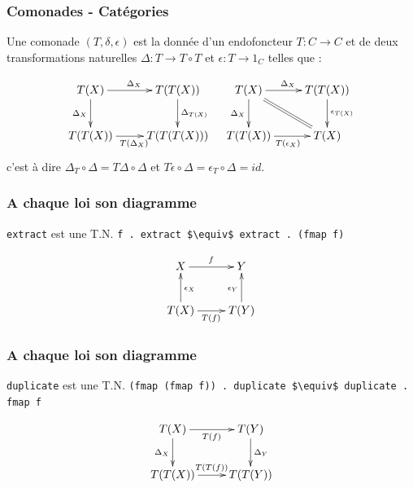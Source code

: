 \documentclass{beamer}
\begin{document}
\begin{frame}
\frametitle{Comonades - Catégories}
Une comonade $(T, \delta, \epsilon)$ est la donnée d'un
endofoncteur $T : C \rightarrow C$ et de deux
transformations naturelles $\Delta : T \rightarrow T\circ T$ et $\epsilon : T \rightarrow 1_C$ telles que :

\[
\begin{array}{cc}
\xymatrix{
T(X) \ar[r]^{\Delta_X} \ar[d]_{\Delta_X} & T(T(X)) \ar[d]^{\Delta_{T(X)}} \\
T(T(X)) \ar[r]_{T(\Delta_X)} & T(T(T(X))) \\
}
&
\xymatrix{
T(X) \ar[d]_{\Delta_X} \ar[r]^{\Delta_X}  \ar@{=}[dr] & T(T(X))   \ar[d]^{\epsilon_{T(X)}} \\
T(T(X)) \ar[r]_{T(\epsilon_X)} & T(X) \\
}
\end{array}
\]
c'est à dire
$\Delta_T \circ \Delta = T \Delta \circ \Delta$
et
$T \epsilon \circ \Delta = \epsilon_T \circ \Delta = id$.
\end{frame}

\begin{frame}
\frametitle{A chaque loi son diagramme}
\begin{alertblock}{\verb!extract! est une T.N.}
\verb!f . extract $\equiv$ extract . (fmap f)!
\end{alertblock}

\begin{block}{}
\[
\xymatrix{
X \ar[r]^{f} & Y  \\
T(X) \ar[r]_{T(f)} \ar[u]_{\epsilon_X} & T(Y) \ar[u]^{\epsilon_Y}\\
}
\]
\end{block}

\end{frame}

\begin{frame}
\frametitle{A chaque loi son diagramme}
\begin{alertblock}{\verb!duplicate! est une T.N.}
\verb!(fmap (fmap f)) . duplicate $\equiv$ duplicate . fmap f!
\end{alertblock}

\begin{block}{}
\[
\xymatrix{
T(X) \ar[r]_{T(f)} \ar[d]_{\Delta_{X}} & T(Y) \ar[d]^{\Delta_{Y}} \\
T(T(X)) \ar[r]^{T(T(f))} & T(T(Y)) \\
}
\]
\end{block}

\end{frame}
\end{document}
